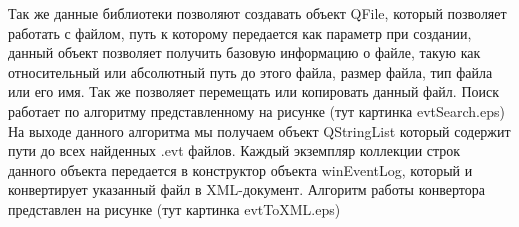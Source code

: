 Так же данные библиотеки позволяют создавать объект QFile, который позволяет работать с файлом, путь к которому передается как параметр при создании, данный объект позволяет получить базовую информацию о файле, такую как относительный или абсолютный путь до этого файла, размер файла, тип файла или его имя. Так же позволяет перемещать или копировать данный файл. Поиск работает по алгоритму представленному на рисунке (тут картинка evtSearch.eps) \\

На выходе данного алгоритма мы получаем объект QStringList который содержит пути до всех найденных .evt файлов. Каждый экземпляр коллекции строк данного объекта передается в конструктор объекта winEventLog, который и конвертирует указанный файл в XML-документ. Алгоритм работы конвертора представлен на рисунке (тут картинка evtToXML.eps) \\


